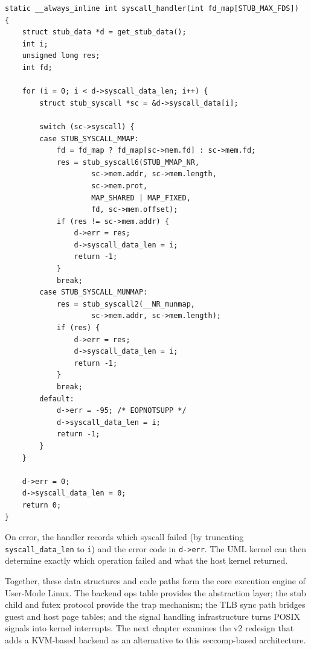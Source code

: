 \begin{lstlisting}[language=KernelC,caption={The stub's syscall batch processor},label=lst:syscall-handler]
static __always_inline int syscall_handler(int fd_map[STUB_MAX_FDS])
{
    struct stub_data *d = get_stub_data();
    int i;
    unsigned long res;
    int fd;

    for (i = 0; i < d->syscall_data_len; i++) {
        struct stub_syscall *sc = &d->syscall_data[i];

        switch (sc->syscall) {
        case STUB_SYSCALL_MMAP:
            fd = fd_map ? fd_map[sc->mem.fd] : sc->mem.fd;
            res = stub_syscall6(STUB_MMAP_NR,
                    sc->mem.addr, sc->mem.length,
                    sc->mem.prot,
                    MAP_SHARED | MAP_FIXED,
                    fd, sc->mem.offset);
            if (res != sc->mem.addr) {
                d->err = res;
                d->syscall_data_len = i;
                return -1;
            }
            break;
        case STUB_SYSCALL_MUNMAP:
            res = stub_syscall2(__NR_munmap,
                    sc->mem.addr, sc->mem.length);
            if (res) {
                d->err = res;
                d->syscall_data_len = i;
                return -1;
            }
            break;
        default:
            d->err = -95; /* EOPNOTSUPP */
            d->syscall_data_len = i;
            return -1;
        }
    }

    d->err = 0;
    d->syscall_data_len = 0;
    return 0;
}
\end{lstlisting}

On error, the handler records which syscall failed (by truncating
\texttt{syscall\_data\_len} to \texttt{i}) and the error code in
\texttt{d->err}.  The UML kernel can then determine exactly which operation
failed and what the host kernel returned.

\vspace{1em}

\noindent
Together, these data structures and code paths form the core execution engine
of User-Mode Linux.  The backend ops table provides the abstraction layer;
the stub child and futex protocol provide the trap mechanism; the TLB sync
path bridges guest and host page tables; and the signal handling infrastructure
turns POSIX signals into kernel interrupts.  The next chapter examines the
v2 redesign that adds a KVM-based backend as an alternative to this
seccomp-based architecture.
